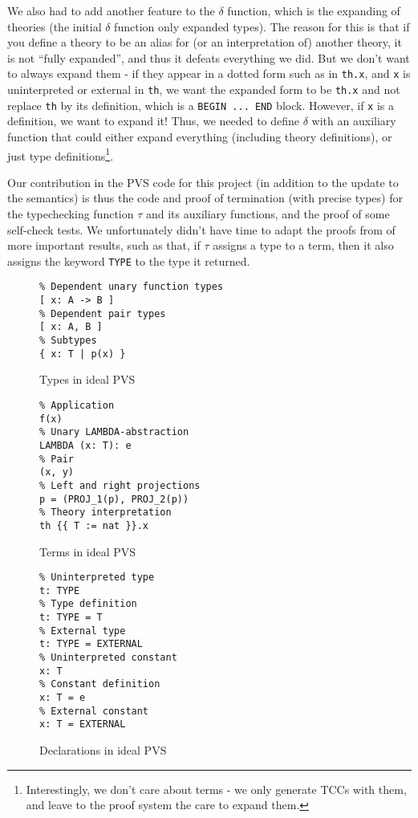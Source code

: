 \documentclass[utf8,a4paper]{article}
\begin{document}
\begin{itemize}
  We also had to add another feature to the $\delta$ function, which
  is the expanding of theories (the initial $\delta$ function only
  expanded types). The reason for this is that if you define a theory
  to be an alias for (or an interpretation of) another theory, it is
  not ``fully expanded'', and thus it defeats everything we did. But
  we don't want to always expand them - if they appear in a dotted
  form such as in \verb!th.x!, and \verb!x! is uninterpreted or
  external in \verb!th!, we want the expanded form to be \verb!th.x!
  and not replace \verb!th! by its definition, which is a
  \verb!BEGIN ... END! block. However, if \verb!x! is a definition, we
  want to expand it! Thus, we needed to define $\delta$ with an
  auxiliary function that could either expand everything (including
  theory definitions), or just type
  definitions\footnote{Interestingly, we don't care about terms - we
    only generate TCCs with them, and leave to the proof system the
    care to expand them.}.
\end{itemize}

Our contribution in the PVS code for this project (in addition to the
update to the semantics) is thus the code and proof of termination
(with precise types) for the typechecking function $\tau$ and its
auxiliary functions, and the proof of some self-check tests. We
unfortunately didn't have time to adapt the proofs from
\cite{PVS-Semantics:TR} of more important results, such as that, if
$\tau$ assigns a type to a term, then it also assigns the keyword
\verb!TYPE! to the type it returned.

\begin{figure}
  \centering
  \begin{verbatim}
% Dependent unary function types
[ x: A -> B ]
% Dependent pair types
[ x: A, B ]
% Subtypes
{ x: T | p(x) }
\end{verbatim}
  \caption{Types in ideal PVS}
  \label{fig:itypes}
\end{figure}

\begin{figure}
  \centering
\begin{verbatim}
% Application
f(x)
% Unary LAMBDA-abstraction
LAMBDA (x: T): e
% Pair
(x, y)
% Left and right projections
p = (PROJ_1(p), PROJ_2(p))
% Theory interpretation
th {{ T := nat }}.x
  \end{verbatim}
  \caption{Terms in ideal PVS}
  \label{fig:iterms}
\end{figure}

\begin{figure}
  \centering
  \begin{verbatim}
% Uninterpreted type
t: TYPE
% Type definition
t: TYPE = T
% External type
t: TYPE = EXTERNAL
% Uninterpreted constant
x: T
% Constant definition
x: T = e
% External constant
x: T = EXTERNAL
  \end{verbatim}
  \caption{Declarations in ideal PVS}
  \label{fig:idecls}
\end{figure}
\end{document}
